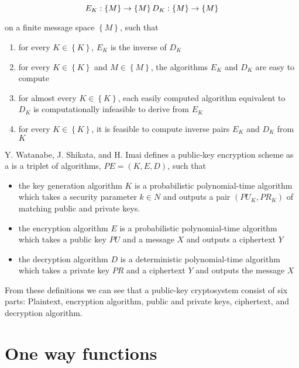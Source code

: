 \documentclass[english,titlepage,11pt]{article}
\begin{document}
\begin{equation}
  E_K: \left \{  M \right \} \rightarrow \left \{  M \right \} \\
  D_K: \left \{  M \right \} \rightarrow \left \{  M \right \}
\end{equation}

on a finite message space $\left \{  M \right \}$, such that

\begin{enumerate}
  \item for every $K \in \left \{ K \right \}$, $E_K$ is the inverse of $D_K$
  \item for every $K \in \left \{ K \right \}$ and $M \in \left \{ M \right \}$, the algorithms $E_K$ and $D_K$ are easy to compute
  \item for almost every $K \in \left \{ K \right \}$, each easily computed algorithm equivalent to $D_K$ is computationally infeasible to derive from $E_K$
  \item for every $K \in \left \{ K \right \}$, it is feasible to compute inverse pairs $E_K$ and $D_K$ from $K$
\end{enumerate}

Y. Watanabe, J. Shikata, and H. Imai defines\cite{watanabe02} a public-key encryption scheme as a is a triplet of algorithms, $PE=(K,E,D)$, such that

\begin{itemize}
  \item the key generation algorithm $K$ is a probabilistic polynomial-time algorithm which takes a security parameter $k \in N$ and outputs a pair $(PU_K, PR_K)$ of matching public and private keys.
  \item the encryption algorithm $E$ is a probabilistic polynomial-time algorithm which takes a public key $PU$ and a message $X$ and outputs a ciphertext $Y$ 
 \item the decryption algorithm $D$ is a deterministic polynomial-time algorithm which takes a private key $PR$ and a ciphertext $Y$ and outputs the message $X$
\end{itemize}

From these definitions we can see that a public-key cryptosystem consist of six parts: Plaintext, encryption algorithm, public and private keys, ciphertext, and decryption algorithm.

\section{One way functions}
\end{document}

